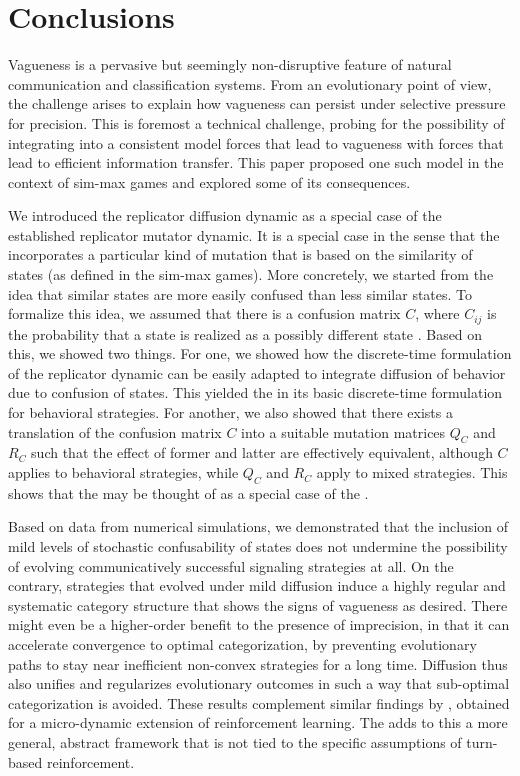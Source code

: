 \section{Conclusions}
\label{sec:conclusions}

Vagueness is a pervasive but seemingly non-disruptive feature of
natural communication and classification systems. From an evolutionary
point of view, the challenge arises to explain how vagueness can
persist under selective pressure for precision. This is foremost a
technical challenge, probing for the possibility of integrating into a
consistent model forces that lead to vagueness with forces that lead
to efficient information transfer. This paper proposed one such model
in the context of sim-max games and explored some of its consequences.

We introduced the replicator diffusion dynamic as a special case of
the established replicator mutator dynamic. It is a special case in
the sense that the \rdd incorporates a particular kind of mutation
that is based on the similarity of states (as defined in the sim-max
games). More concretely, we started from the idea that similar states
are more easily confused than less similar states. To formalize this
idea, we assumed that there is a confusion matrix $C$, where $C_{ij}$
is the probability that a state  is realized as a possibly
different state . Based on this, we showed two things. For
one, we showed how the discrete-time formulation of the replicator
dynamic can be easily adapted to integrate diffusion of behavior due
to confusion of states. This yielded the \rdd in its basic
discrete-time formulation for behavioral strategies. For another, we
also showed that there exists a translation of the confusion matrix
$C$ into a suitable mutation matrices $Q_C$ and $R_C$ such that the
effect of former and latter are effectively equivalent, although $C$
applies to behavioral strategies, while $Q_C$ and $R_C$ apply to mixed
strategies. This shows that the \rdd may be thought of as a special
case of the \rmd.

Based on data from numerical simulations, we demonstrated that the
inclusion of mild levels of stochastic confusability of states does
not undermine the possibility of evolving communicatively successful
signaling strategies at all. On the contrary, strategies that evolved
under mild diffusion induce a highly regular and systematic category
structure that shows the signs of vagueness as desired. There might
even be a higher-order benefit to the presence of imprecision, in that
it can accelerate convergence to optimal categorization, by preventing
evolutionary paths to stay near inefficient non-convex strategies for
a long time. Diffusion thus also unifies and regularizes evolutionary
outcomes in such a way that sub-optimal categorization is
avoided. These results complement similar findings by
\citet{OConnor2013:The-Evolution-o}, obtained for a micro-dynamic
extension of reinforcement learning. The \rdd adds to this a more
general, abstract framework that is not tied to the specific
assumptions of turn-based reinforcement.

